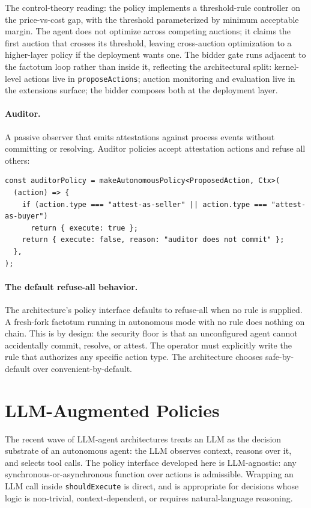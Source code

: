 \documentclass[11pt,a4paper]{article}
\theoremstyle{definition}
\theoremstyle{remark}
\begin{document}
The control-theory reading: the policy implements a threshold-rule
controller on the price-vs-cost gap, with the threshold
parameterized by minimum acceptable margin. The agent does not
optimize across competing auctions; it claims the first auction
that crosses its threshold, leaving cross-auction optimization to
a higher-layer policy if the deployment wants one. The bidder
gate runs adjacent to the factotum loop rather than inside it,
reflecting the architectural split: kernel-level actions live in
\texttt{proposeActions}; auction monitoring and evaluation live
in the extensions surface; the bidder composes both at the
deployment layer.

\paragraph{Auditor.}
A passive observer that emits attestations against process events
without committing or resolving. Auditor policies accept attestation
actions and refuse all others:

\begin{lstlisting}
const auditorPolicy = makeAutonomousPolicy<ProposedAction, Ctx>(
  (action) => {
    if (action.type === "attest-as-seller" || action.type === "attest-as-buyer")
      return { execute: true };
    return { execute: false, reason: "auditor does not commit" };
  },
);
\end{lstlisting}

\paragraph{The default refuse-all behavior.}
The architecture's policy interface defaults to refuse-all when no
rule is supplied. A fresh-fork factotum running in autonomous mode
with no rule does nothing on chain. This is by design: the
security floor is that an unconfigured agent cannot accidentally
commit, resolve, or attest. The operator must explicitly write
the rule that authorizes any specific action type. The
architecture chooses safe-by-default over
convenient-by-default.

\section{LLM-Augmented Policies}
\label{sec:llm}

The recent wave of LLM-agent architectures
\citep{yao2023react, shinn2023reflexion, park2023generative,
wu2023autogen} treats an LLM as the decision substrate of an
autonomous agent: the LLM observes context, reasons over it, and
selects tool calls. The policy interface developed here is
LLM-agnostic: any synchronous-or-asynchronous function over
actions is admissible. Wrapping an LLM call inside
\texttt{shouldExecute} is direct, and is appropriate for decisions
whose logic is non-trivial, context-dependent, or requires
natural-language reasoning.
\end{document}
